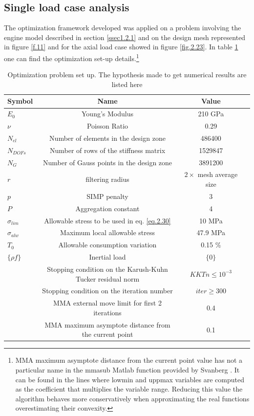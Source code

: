  \subsection{Single load case analysis}
   The optimization framework developed was applied on a problem involving the engine model described in section \ref{ssec1.2.1} and on the design mesh represented in figure \ref{f.11} and for the axial load case showed in figure \ref{fig.2.23}.  In table \ref{tab:table2} one can find the optimization set-up details.\footnote{MMA maximum asymptote distance from the current point value has not a particular name in the mmasub Matlab function provided by Svanberg \cite{svanberg2004some}. It can be found in the lines where lowmin and uppmax variables are computed as the coefficient that multiplies the variable range. Reducing this value the algorithm behaves more conservatively when approximating the real functions overestimating their convexity.}
    \begin{table}[h]
         \caption{\label{tab:table2} Optimization problem set up. The hypothesis made to get numerical results are listed here}
          \centering
          \begin{tabular}{lccc}
          \hline
           Symbol& Name& Value\\\hline
          $E_0$ & Young's Modulus & 210 GPa\\
          $\nu$ & Poisson Ratio& 0.29&\\ $N_{el}$ & Number of elements in the design zone & 486400 \\
          $N_{DOFs}$ & Number of rows of the stiffness matrix & 1529847\\
          $N_G$ & Number of Gauss points in the design zone & 3891200\\
 		$r$ & filtering radius & $2 \times$ mesh average size  \\
 		$p$ & SIMP penalty & 3\\
 		$P$ & Aggregation constant & 4\\  
 		$\sigma_{lim}$ & Allowable stress to be used in eq. \eqref{eq.2.30} & 10 MPa\\
 		$\sigma_{alw}$ & Maximum local allowable stress & 47.9 MPa\\
 		$T_0$ & Allowable consumption variation & 0.15 \% \\
 		$\lbrace\rho f \rbrace$ & Inertial load & $\lbrace 0 \rbrace$ \\
 		 & Stopping condition on the Karush-Kuhn Tucker residual norm & $KKTn\leq10^{-3}$\\ 
 		& Stopping condition on the iteration number & $iter \geq 300$ \\
 		& MMA external move limit for first 2 iterations & 0.4 \\
 		& MMA maximum asymptote distance from the current point & 0.1 \\
          \hline
          \end{tabular}
          \end{table}
